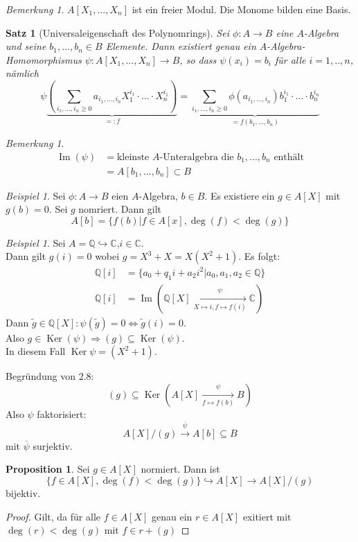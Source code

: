 \documentclass[10pt,a4paper]{article}
\newcommand{\Q}{\ensuremath{\mathbb{Q}}}
\newcommand{\C}{\ensuremath{\mathbb{C}}}
\newcommand{\ol}[1]{\overline{#1}}
\newcounter{thm}[section]
\theoremstyle{definition}
\newtheorem{prop}[thm]{Proposition}
\theoremstyle{plain}
\newtheorem{satz}[thm]{Satz}
\theoremstyle{remark}
\newtheorem{bem}[thm]{Bemerkung}
\newtheorem{exm}[thm]{Beispiel}
\begin{document}

\begin{bem}
	$A[X_1,...,X_n]$ ist ein freier Modul. Die Monome bilden eine Basis.
\end{bem}

\begin{satz}[Universaleigenschaft des Polynomrings]
	Sei $\phi:A\rightarrow B$ eine $A$-Algebra und seine $b_1,...,b_n\in B$ Elemente. Dann existiert genau ein $A$-Algebra-Homomorphismus $\psi:A[X_1,...,X_n]\rightarrow B$, so dass $\psi(x_i)=b_i$ für alle $i=1,..,n$, nämlich
	\[\psi\underbrace{\left(\sum_{i_1,...,i_n\ge 0}a_{i_1,...,i_n}X_1^{i_1}\cdot...\cdot X_n^{i_1}\right)}_{=:f}=\underbrace{\sum_{i_1,...,i_n\ge 0}\phi(a_{i_1,...,i_n})b_1^{i_1}\cdot...\cdot b_n^{i_n}}_{=f(b_1,...,b_n)}\]
\end{satz}
\begin{bem}
	\begin{align*}
	\operatorname{Im}(\psi)&=\text{kleinste $A$-Unteralgebra die $b_1,...,b_n$ enthält}\\
	&=A[b_1,...,b_n]\subset B
	\end{align*}
\end{bem}
\begin{exm}
	Sei $\phi:A\rightarrow B$ eien $A$-Algebra, $b\in B$. Es existiere ein $g\in A[X]$ mit $g(b)=0$. Sei $g$ nomriert. Dann gilt\\
	\[A[b]=\{f(b)|f\in A[x],\deg(f)<\deg (g)\}\]
\end{exm}
\begin{exm}
	Sei $A=\Q\hookrightarrow\C$,$i\in \C$. \\
	Dann gilt $g(i)=0$ wobei $g=X^3+X=X(X^2+1)$. Es folgt:
	\begin{align*}
	\Q[i]&=\{a_0+q_1i+a_2i^2|a_0,a_1,a_2\in\Q\}\\
	\Q[i]&=\operatorname{Im}(\Q[X]\xrightarrow[X\mapsto i, f\mapsto f(i)]{\psi}\C)
	\end{align*}
	Dann $\tilde{g}\in\Q[X]: \psi(\tilde{g})=0\Leftrightarrow \tilde{g}(i)=0$.\\
	Also $g\in\operatorname{Ker}(\psi)\Rightarrow (g)\subseteq\operatorname{Ker}(\psi)$.\\
In diesem Fall $\operatorname{Ker}\psi=(X^2+1)$.\\
\end{exm}
Begründung von 2.8:
\[(g)\subseteq\operatorname{Ker}\left(A[X]\xrightarrow[f\mapsto f(b)]{\psi}B\right)\]
Also $\psi$ faktorisiert:
\[A[X]/(g)\xrightarrow{\ol{\psi}}A[b]\subseteq B\]
mit $\ol{\psi}$ surjektiv.
\begin{prop}
	Sei $g\in A[X]$ normiert. Dann ist\[\{f\in A[X],\deg(f)<\deg(g)\}\hookrightarrow A[X]\rightarrow A[X]/(g)\]
	bijektiv.
\end{prop}
\begin{proof}
	Gilt, da für alle $f\in A[X]$ genau ein $r\in A[X]$ exitiert mit $\deg(r)<\deg(g)$ mit $f\in r+(g)$
\end{proof}
\end{document}

